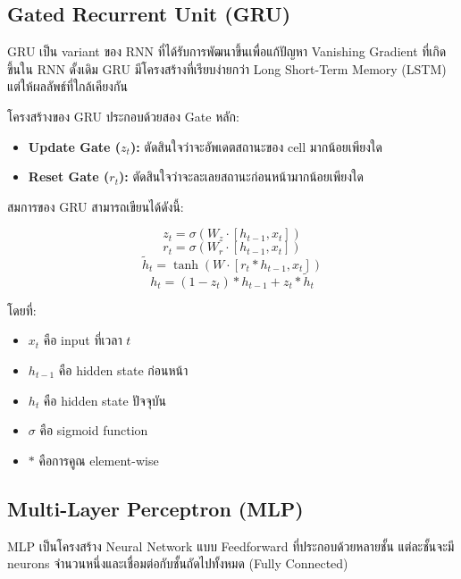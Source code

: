 \documentclass[12pt,a4paper]{report}
\begin{document}
\subsection{Gated Recurrent Unit (GRU)}

GRU เป็น variant ของ RNN ที่ได้รับการพัฒนาขึ้นเพื่อแก้ปัญหา Vanishing Gradient ที่เกิดขึ้นใน RNN ดั้งเดิม 
 GRU มีโครงสร้างที่เรียบง่ายกว่า Long Short-Term Memory (LSTM) แต่ให้ผลลัพธ์ที่ใกล้เคียงกัน

โครงสร้างของ GRU ประกอบด้วยสอง Gate หลัก:

\begin{itemize}
    \item \textbf{Update Gate ($z_t$):} ตัดสินใจว่าจะอัพเดตสถานะของ cell มากน้อยเพียงใด
    \item \textbf{Reset Gate ($r_t$):} ตัดสินใจว่าจะละเลยสถานะก่อนหน้ามากน้อยเพียงใด
\end{itemize}

สมการของ GRU สามารถเขียนได้ดังนี้:

\begin{equation}
z_t = \sigma(W_z \cdot [h_{t-1}, x_t])
\end{equation}
\begin{equation}
r_t = \sigma(W_r \cdot [h_{t-1}, x_t])
\end{equation}
\begin{equation}
\tilde{h}_t = \tanh(W \cdot [r_t * h_{t-1}, x_t])
\end{equation}
\begin{equation}
h_t = (1 - z_t) * h_{t-1} + z_t * \tilde{h}_t
\end{equation}

โดยที่:
\begin{itemize}
    \item $x_t$ คือ input ที่เวลา $t$
    \item $h_{t-1}$ คือ hidden state ก่อนหน้า
    \item $h_t$ คือ hidden state ปัจจุบัน
    \item $\sigma$ คือ sigmoid function
    \item $*$ คือการคูณ element-wise
\end{itemize}

\subsection{Multi-Layer Perceptron (MLP)}

MLP เป็นโครงสร้าง Neural Network แบบ Feedforward ที่ประกอบด้วยหลายชั้น 
แต่ละชั้นจะมี neurons จำนวนหนึ่งและเชื่อมต่อกับชั้นถัดไปทั้งหมด (Fully Connected)
\end{document}
